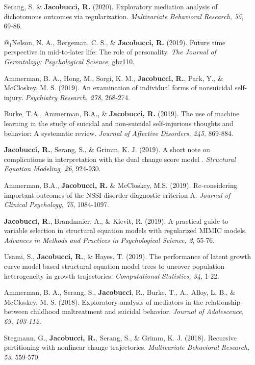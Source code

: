 \documentclass[letterpaper,10pt]{article}
\begin{document}
\begin{etaremune}
	\item Serang, S. \& \textbf{Jacobucci, R.} (2020). Exploratory mediation analysis of dichotomous outcomes via regularization. \emph{Multivariate Behavioral Research, 55}, 69-86.
	\item  $@_1$Nelson, N. A., Bergeman, C. S., \& \textbf{Jacobucci, R.} (2019). Future time perspective in mid-to-later life: The role of personality. \emph{The Journal of Gerontology: Psychological Science}, gbz110.
	\item  Ammerman, B. A., Hong, M., Sorgi, K. M., \textbf{Jacobucci, R.}, Park, Y., \& McCloskey, M. S. (2019). An examination of individual forms of nonsuicidal self-injury. \emph{Psychiatry Research, 278,} 268-274.
	\item  Burke, T.A., Ammerman, B.A., \& \textbf{Jacobucci, R.} (2019). The use of machine learning in the study of suicidal and non-suicidal self-injurious thoughts and behavior: A systematic review. \emph{Journal of Affective Disorders, 245,} 869-884.
	\item  \textbf{Jacobucci, R.}, Serang, S., \& Grimm, K. J. (2019). A short note on complications in interpretation with the dual change score model . \emph{Structural Equation Modeling, 26}, 924-930.
	\item  Ammerman, B.A., \textbf{Jacobucci, R.} \& McCloskey, M.S. (2019). Re-considering important outcomes of the NSSI disorder diagnostic criterion A. \emph{Journal of Clinical Psychology, 75}, 1084-1097.
	\item  \textbf{Jacobucci, R.}, Brandmaier, A., \& Kievit, R. (2019). A practical guide to variable selection in structural equation models with regularized MIMIC models. \emph{Advances in Methods and Practices in Psychological Science, 2}, 55-76.  
	\item  Usami, S., \textbf{Jacobucci, R.}, \& Hayes, T. (2019). The performance of latent growth curve model based structural equation model trees to uncover population heterogeneity in growth trajectories. \emph{Computational Statistics, 34}, 1-22.
	\item Ammerman, B. A., Serang, S., \textbf{Jacobucci}, R., Burke, T., A., Alloy, L. B., \& McCloskey, M. S. (2018). Exploratory analysis of mediators in the relationship between childhood maltreatment and suicidal behavior. \emph{Journal of Adolescence, 69, 103-112.}
	\item Stegmann, G., \textbf{Jacobucci, R.}, Serang, S., \& Grimm, K. J. (2018). Recursive partitioning with nonlinear change trajectories. \emph{Multivariate Behavioral Research, 53}, 559-570.

\end{etaremune}
\end{document}
